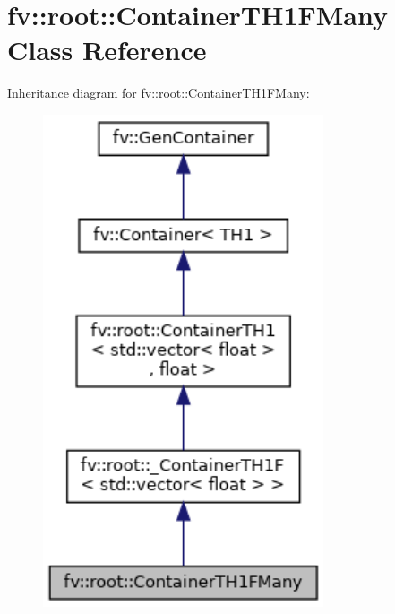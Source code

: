 \hypertarget{classfv_1_1root_1_1ContainerTH1FMany}{}\section{fv\+:\+:root\+:\+:Container\+T\+H1\+F\+Many Class Reference}
\label{classfv_1_1root_1_1ContainerTH1FMany}


Inheritance diagram for fv\+:\+:root\+:\+:Container\+T\+H1\+F\+Many\+:
\nopagebreak
\begin{figure}[H]
\begin{center}
\leavevmode
\includegraphics[width=235pt]{classfv_1_1root_1_1ContainerTH1FMany__inherit__graph}
\end{center}
\end{figure}


